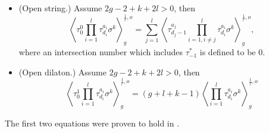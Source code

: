 \documentclass[11pt]{amsart}
\theoremstyle{definition}
\theoremstyle{remark}
\newcommand{\<}{\left<}
\renewcommand{\>}{\right>}
\numberwithin{equation}{section}
\begin{document}
\begin{itemize}
\begin{equation}
\begin{split}
&+\frac{1}{2}\left\langle \prod_{i\in [l]}\tau^{a_i}_{d_i}\sigma^{k+1}\right\rangle^{\frac{1}{r},o}_0.
    \end{split}
\end{equation}\label{eq:g=1_trr}
\item[(d)](Open string.)
Assume $2g-2+k+2l>0$, then %
\begin{equation}\label{eq:open_string}
\left\langle\tau^0_0\prod_{i=1}^l\tau^{a_i}_{d_i}\sigma^k\right\rangle^{\frac{1}{r},o}_g=\sum_{j=1}^l\left\langle\tau^{a_j}_{d_j-1}\prod_{i=1,i\neq j}^l\tau^{a_i}_{d_i}\sigma^k\right\rangle^{\frac{1}{r},o}_g,
\end{equation}
where an intersection number which includes $\tau^*_{-1}$ is defined to be $0.$
\item[(e)]%
(Open dilaton.)
Assume %
$2g-2+k+2l>0$, %
then
\begin{equation}\label{eq:open_dilaton}
\left\langle\tau^1_0\prod_{i=1}^l\tau^{a_i}_{d_i}\sigma^k\right\rangle^{\frac{1}{r},o}_g=(g+l+k-1)\left\langle\prod_{i=1}^l\tau^{a_i}_{d_i}\sigma^k\right\rangle^{\frac{1}{r},o}_g
\end{equation}
\end{itemize}
The %
first two equations were proven to hold in \cite{BCT2}.
\end{document}
